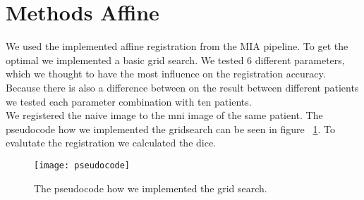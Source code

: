 \section{Methods Affine}
We used the implemented affine registration from the MIA pipeline. To get the optimal we implemented a basic grid search. We tested 6 different parameters, which we thought to have the most influence on the registration accuracy. Because there is also a difference between on the result between different patients we tested each parameter combination with ten patients. \\ We registered the naive image to the mni image of the same patient. The pseudocode how we implemented the gridsearch can be seen in figure ~\ref{fig:pseudocode_gridsearch}. To evalutate the registration we calculated the dice.

\begin{figure}[!h]
	\centering
	\texttt{[image: pseudocode]}
	\caption{The pseudocode how we implemented the grid search.}
	\label{fig:pseudocode_gridsearch}
\end{figure}
